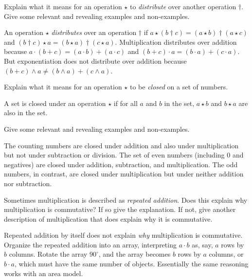 \documentclass[nooutcomes]{ximera}
\begin{document}
\begin{problem}Explain what it means for an operation $\star$ to \textit{distribute}
  over another operation $\dagger$. Give some relevant and revealing
  examples and non-examples.
\begin{freeResponse}
\begin{hint}
An operation $\star$ \textit{distributes} over an operation $\dagger$ if $a\star(b\dagger c) = (a\star b) \dagger (a\star c)$ and $(b\dagger c)\star a = (b\star a) \dagger (c\star a)$.  
Multiplication distributes over addition because $a\cdot(b+c) = (a\cdot b)+(a\cdot c)$ and $(b+c)\cdot a = (b\cdot a)+(c\cdot a)$.  
But exponentiation does not distribute over addition because $(b+c)\wedge a \ne (b\wedge a)+(c\wedge a)$.
\end{hint}
\end{freeResponse}
\end{problem} 

\begin{problem}Explain what it means for an operation $\star$ to be \textit{closed}
  on a set of numbers. 
\begin{freeResponse}
\begin{hint}
A set is closed under an operation $\star$ if for all $a$ and $b$ in the set, $a\star b$ and $b\star a$ are also in the set.  
\end{hint}
\end{freeResponse}

\begin{problem}
Give some relevant and revealing examples and non-examples.
\begin{freeResponse}
\begin{hint}
The counting numbers are closed under addition and also under multiplication but not under subtraction or division.  The set of even numbers (including $0$ and negatives) are closed under addition, subtraction, and multiplication.  The odd numbers, in contrast, are closed under multiplication but under neither addition nor subtraction.
\end{hint}
\end{freeResponse}
\end{problem}
\end{problem} 

\begin{problem}Sometimes multiplication is described as \textit{repeated
  addition}. Does this explain why multiplication is commutative? If
  so give the explanation. If not, give another description of
  multiplication that does explain why it is commutative.
\begin{freeResponse}
\begin{hint}
Repeated addition by itself does not explain \textit{why} multiplication is commutative.  Organize the repeated addition into an array, interpreting $a\cdot b$ as, say, $a$ rows by $b$ columns.  Rotate the array $90^\circ$, and the array becomes $b$ rows by $a$ columns, or $b\cdot a$, which must have the same number of objects.  Essentially the same reasoning works with an area model.  
\end{hint}
\end{freeResponse}
\end{problem} 
\end{document}
